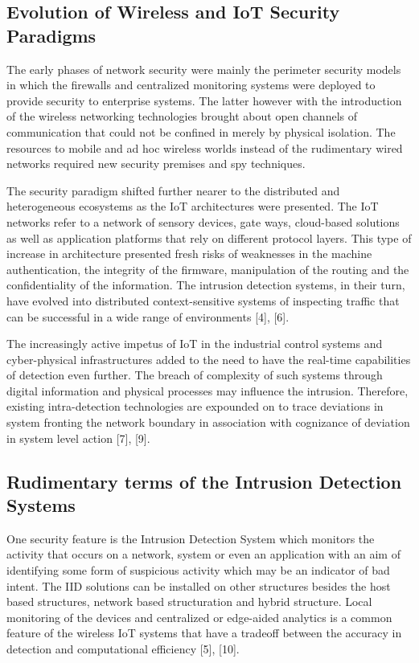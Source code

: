 \documentclass[12pt]{article}
\begin{document}
\subsection{Evolution of Wireless and IoT Security Paradigms}



The early phases of network security were mainly the perimeter security models in which the firewalls and centralized monitoring systems were deployed to provide security to enterprise systems. The latter however with the introduction of the wireless networking technologies brought about open channels of communication that could not be confined in merely by physical isolation. The resources to mobile and ad hoc wireless worlds instead of the rudimentary wired networks required new security premises and spy techniques.



The security paradigm shifted further nearer to the distributed and heterogeneous ecosystems as the IoT architectures were presented. The IoT networks refer to a network of sensory devices, gate ways, cloud-based solutions as well as application platforms that rely on different protocol layers. This type of increase in architecture presented fresh risks of weaknesses in the machine authentication, the integrity of the firmware, manipulation of the routing and the confidentiality of the information. The intrusion detection systems, in their turn, have evolved into distributed context-sensitive systems of inspecting traffic that can be successful in a wide range of environments [4], [6].



The increasingly active impetus of IoT in the industrial control systems and cyber-physical infrastructures added to the need to have the real-time capabilities of detection even further. The breach of complexity of such systems through digital information and physical processes may influence the intrusion. Therefore, existing intra-detection technologies are expounded on to trace deviations in system fronting the network boundary in association with cognizance of deviation in system level action [7], [9].



\subsection{Rudimentary terms of the Intrusion Detection Systems}



One security feature is the Intrusion Detection System which monitors the activity that occurs on a network, system or even an application with an aim of identifying some form of suspicious activity which may be an indicator of bad intent. The IID solutions can be installed on other structures besides the host based structures, network based structuration and hybrid structure. Local monitoring of the devices and centralized or edge-aided analytics is a common feature of the wireless IoT systems that have a tradeoff between the accuracy in detection and computational efficiency [5], [10].
\end{document}
